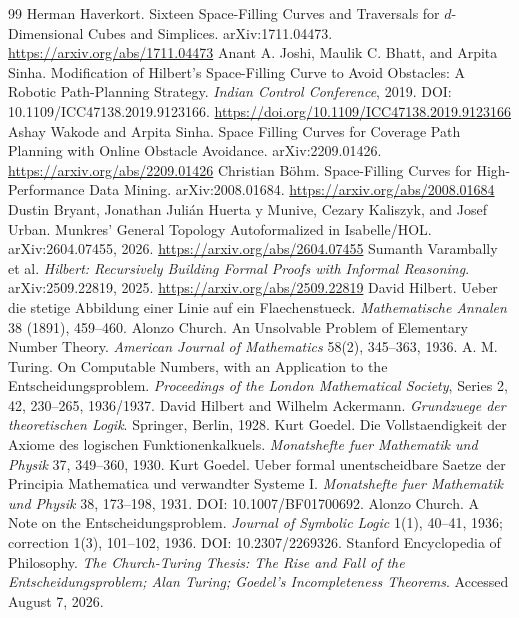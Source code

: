 \documentclass[11pt]{article}
\theoremstyle{hilberttheorem}
\begin{document}
\begin{thebibliography}{99}
 Herman Haverkort. Sixteen Space-Filling Curves and Traversals for $d$-Dimensional Cubes and Simplices. arXiv:1711.04473. \url{https://arxiv.org/abs/1711.04473}
 Anant A. Joshi, Maulik C. Bhatt, and Arpita Sinha. Modification of Hilbert's Space-Filling Curve to Avoid Obstacles: A Robotic Path-Planning Strategy. \emph{Indian Control Conference}, 2019. DOI: 10.1109/ICC47138.2019.9123166. \url{https://doi.org/10.1109/ICC47138.2019.9123166}
 Ashay Wakode and Arpita Sinha. Space Filling Curves for Coverage Path Planning with Online Obstacle Avoidance. arXiv:2209.01426. \url{https://arxiv.org/abs/2209.01426}
 Christian B\"ohm. Space-Filling Curves for High-Performance Data Mining. arXiv:2008.01684. \url{https://arxiv.org/abs/2008.01684}
 Dustin Bryant, Jonathan Juli\'an Huerta y Munive, Cezary Kaliszyk, and Josef Urban. Munkres' General Topology Autoformalized in Isabelle/HOL. arXiv:2604.07455, 2026. \url{https://arxiv.org/abs/2604.07455}
 Sumanth Varambally et al. \emph{Hilbert: Recursively Building Formal Proofs with Informal Reasoning}. arXiv:2509.22819, 2025. \url{https://arxiv.org/abs/2509.22819}
 David Hilbert. Ueber die stetige Abbildung einer Linie auf ein Flaechenstueck. \emph{Mathematische Annalen} 38 (1891), 459--460.
 Alonzo Church. An Unsolvable Problem of Elementary Number Theory. \emph{American Journal of Mathematics} 58(2), 345--363, 1936.
 A. M. Turing. On Computable Numbers, with an Application to the Entscheidungsproblem. \emph{Proceedings of the London Mathematical Society}, Series 2, 42, 230--265, 1936/1937.
 David Hilbert and Wilhelm Ackermann. \emph{Grundzuege der theoretischen Logik}. Springer, Berlin, 1928.
 Kurt Goedel. Die Vollstaendigkeit der Axiome des logischen Funktionenkalkuels. \emph{Monatshefte fuer Mathematik und Physik} 37, 349--360, 1930.
 Kurt Goedel. Ueber formal unentscheidbare Saetze der Principia Mathematica und verwandter Systeme I. \emph{Monatshefte fuer Mathematik und Physik} 38, 173--198, 1931. DOI: 10.1007/BF01700692.
 Alonzo Church. A Note on the Entscheidungsproblem. \emph{Journal of Symbolic Logic} 1(1), 40--41, 1936; correction 1(3), 101--102, 1936. DOI: 10.2307/2269326.
 Stanford Encyclopedia of Philosophy. \emph{The Church-Turing Thesis: The Rise and Fall of the Entscheidungsproblem; Alan Turing; Goedel's Incompleteness Theorems}. Accessed August 7, 2026.

\end{thebibliography}
\end{document}
